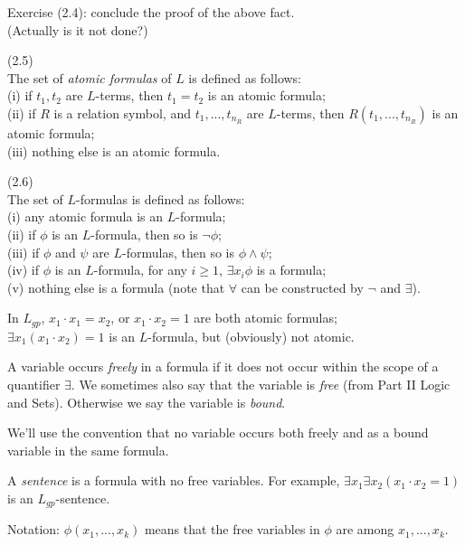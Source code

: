 \documentclass[a4paper]{article}
\begin{document}
Exercise (2.4): conclude the proof of the above fact.\\
(Actually is it not done?)

\begin{defi} (2.5)\\
    The set of \emph{atomic formulas} of $L$ is defined as follows:\\
    (i) if $t_1,t_2$ are $L$-terms, then $t_1 = t_2$ is an atomic formula;\\
    (ii) if $R$ is a relation symbol, and $t_1,...,t_{n_R}$ are $L$-terms, then $R(t_1,...,t_{n_R})$ is an atomic formula;\\
    (iii) nothing else is an atomic formula.
\end{defi}

\begin{defi} (2.6)\\
    The set of $L$-formulas is defined as follows:\\
    (i) any atomic formula is an $L$-formula;\\
    (ii) if $\phi$ is an $L$-formula, then so is $\neg \phi$;\\
    (iii) if $\phi$ and $\psi$ are $L$-formulas, then so is $\phi \wedge \psi$;\\
    (iv) if $\phi$ is an $L$-formula, for any $i \geq 1$, $\exists x_i \phi$ is a formula;\\
    (v) nothing else is a formula (note that $\forall$ can be constructed by $\neg$ and $\exists$).
\end{defi}

\begin{eg}
    In $L_{gp}$, $x_1\cdot x_1 = x_2$, or $x_1\cdot x_2=1$ are both atomic formulas;\\
    $\exists x_1(x_1 \cdot x_2) = 1$ is an $L$-formula, but (obviously) not atomic.
\end{eg}

A variable occurs \emph{freely} in a formula if it does not occur within the scope of a quantifier $\exists$. We sometimes also say that the variable is \emph{free} (from Part II Logic and Sets). Otherwise we say the variable is \emph{bound}.

We'll use the convention that no variable occurs both freely and as a bound variable in the same formula.

A \emph{sentence} is a formula with no free variables. For example, $\exists x_1\exists x_2 (x_1\cdot x_2=1)$ is an $L_{gp}$-sentence.

Notation: $\phi(x_1,...,x_k)$ means that the free variables in $\phi$ are among $x_1,...,x_k$.
\end{document}
